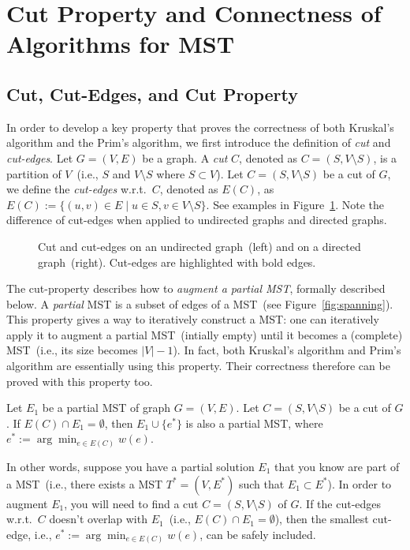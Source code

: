 \section{Cut Property and Connectness of Algorithms for MST}

\subsection*{Cut, Cut-Edges, and Cut Property}

In order to develop a key property that proves the correctness of both Kruskal's algorithm
and the Prim's algorithm, we first introduce the definition of \emph{cut} and \emph{cut-edges}.
Let $G = (V, E)$ be a graph. A \emph{cut} $C$, denoted as $C = (S, V\setminus S)$,
is a partition of $V$~(i.e., $S$ and $V\setminus S$ where $S\subset V$).
Let $C = (S, V\setminus S)$ be a cut of $G$, we define the \emph{cut-edges} w.r.t.\ $C$,
denoted as $E(C)$, as $E(C) := \{(u,v)\in E\mid u\in S, v\in V\setminus S\}$.
See examples in Figure~\ref{fig:cut}.  Note the difference of cut-edges
when applied to undirected graphs and directed graphs.

\begin{figure}[h]
\centering{}
\caption{Cut and cut-edges on an undirected graph~(left) and on a directed graph~(right).
Cut-edges are highlighted with bold edges.}
\label{fig:cut}
\end{figure}

The cut-property describes how to \emph{augment a partial MST}, 
formally described below.
A \emph{partial} MST is a subset of edges of a MST~(see Figure~\ref{fig:spanning}).
This property gives a way to iteratively construct a MST: one can iteratively
apply it to augment a partial MST~(intially empty) until it becomes a (complete) 
MST~(i.e., its size becomes $|V| - 1$).
In fact, both Kruskal's algorithm and Prim's algorithm
are essentially using this property.
Their correctness therefore can be proved with this property too.

\begin{claim}
Let $E_1$ be a partial MST of graph $G = (V, E)$. %
Let $C = (S,V\setminus S)$ be a cut of $G$.
If $E(C) \cap E_1 = \emptyset$, %
then $E_1\cup \{e^*\}$ is also a partial MST, where $e^* := \arg\min_{e\in E(C)} w(e)$.
\end{claim}

In other words, suppose you have a partial solution $E_1$ that you know
are part of a MST~(i.e., there exists a MST $T^* = (V, E^*)$ such that $E_1\subset E^*$). 
In order to augment $E_1$, you will need to find a cut $C = (S, V\setminus S)$ of $G$.
If the cut-edges w.r.t.\ $C$ doesn't overlap with $E_1$~(i.e., $E(C)\cap E_1 = \emptyset$),
then the smallest cut-edge, i.e., $e^* := \arg\min_{e\in E(C)} w(e)$,
can be safely included.

